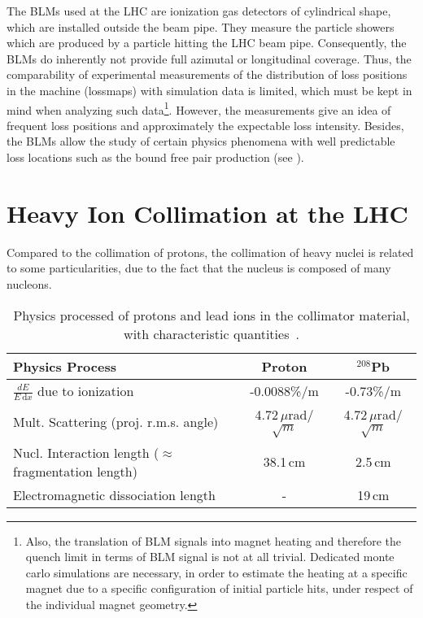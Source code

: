 The BLMs used at the LHC are ionization gas detectors of cylindrical shape, which are installed outside the beam pipe. They measure the particle showers which are produced by a particle hitting the LHC beam pipe.
Consequently, the BLMs do inherently not provide full azimutal or longitudinal coverage. Thus, the comparability of experimental measurements of the distribution of loss positions in the machine (lossmaps) with simulation data is limited, which must be kept in mind when analyzing such data\footnote{Also, the translation of BLM signals into magnet heating and therefore the quench limit in terms of BLM signal is not at all trivial. Dedicated monte carlo simulations are necessary, in order to estimate the heating at a specific magnet due to a specific configuration of initial particle hits, under respect of the individual magnet geometry.  }. However, the measurements give an idea of frequent loss positions and approximately the expectable loss intensity. Besides, the BLMs allow the study of certain physics phenomena with well predictable loss locations such as the bound free pair production (see ). 













\section{Heavy Ion Collimation at the LHC}

Compared to the collimation of protons, the collimation of heavy nuclei is related to some particularities, due to the fact that the nucleus is composed of many nucleons. 

\begin{table}[htbp]
\caption{Physics processed of protons and lead ions in the collimator material, with characteristic quantities~\cite{braun2004collimation}.}
\begin{center}
\begin{tabular}{ l c c }
\toprule
\midrule
Physics Process & Proton & $^{208}$Pb \\ \midrule \midrule
$\frac{dE}{E\,\mathrm{d}x}$ due to ionization & -0.0088\%/m & -0.73\%/m \\ \midrule
Mult. Scattering (proj. r.m.s. angle) & 4.72$\,\mu$rad/$\sqrt{m}$ & 4.72$\,\mu$rad/$\sqrt{m}$ \\ \midrule
Nucl. Interaction length ($\approx$ fragmentation length) & 38.1$\,$cm & 2.5$\,$cm \\ \midrule
Electromagnetic dissociation length & - & 19$\,$cm \\ 
\midrule
\bottomrule
\end{tabular}
\end{center}
\label{}
\end{table}


